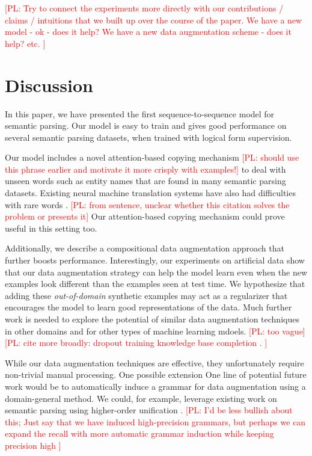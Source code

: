 \documentclass[11pt,letterpaper]{article}
\newcommand\pl[1]{\textcolor{red}{[PL: #1]}}
\begin{document}
\pl{
  Try to connect the experiments more directly with our contributions / claims
  / intuitions that we built up over the course of the paper.
  We have a new model - ok - does it help?
  We have a new data augmentation scheme - does it help?
  etc.
}

\section{Discussion}
\label{sec:discussion}
In this paper, we have presented the first sequence-to-sequence
model for semantic parsing.  Our model is easy to train
and gives good performance on several semantic parsing
datasets, when trained with logical form supervision.

Our model includes a novel attention-based copying mechanism
\pl{should use this phrase earlier and motivate it more crisply with examples!}
to deal with 
unseen words such as entity names that are found in many semantic parsing datasets.
Existing neural machine translation systems have also had
difficulties with rare words \cite{luong2015rare}. \pl{from sentence, unclear whether this citation
solves the problem or presents it}
Our attention-based copying mechanism could prove useful in this setting too.

Additionally, we describe a compositional data augmentation approach that 
further boosts performance.
Interestingly, our experiments on artificial data show that
our data augmentation strategy can help the model learn
even when the new examples look different than the examples seen at test time.  
We hypothesize that adding these \emph{out-of-domain} synthetic examples
may act as a regularizer that encourages the model
to learn good representations of the data.
Much further work is needed to explore the potential of
similar data augmentation techniques in other domains
and for other types of machine learning mdoels.
\pl{too vague}
\pl{cite more broadly:
dropout training \cite{hinton2012improving,wager2014altitude}
knowledge base completion \cite{guu2015traversing}.
}

While our data augmentation techniques are effective,
they unfortunately require non-trivial manual processing.
One possible extension 
One line of potential future work would be to
automatically induce a grammar for data augmentation
using a domain-general method.
We could, for example, leverage existing work on semantic parsing
using higher-order unification \cite{kwiatkowski10ccg}.
\pl{I'd be less bullish about this;
  Just say that we have induced high-precision grammars,
  but perhaps we can expand the recall with more automatic grammar induction
  while keeping precision high
}
\end{document}
